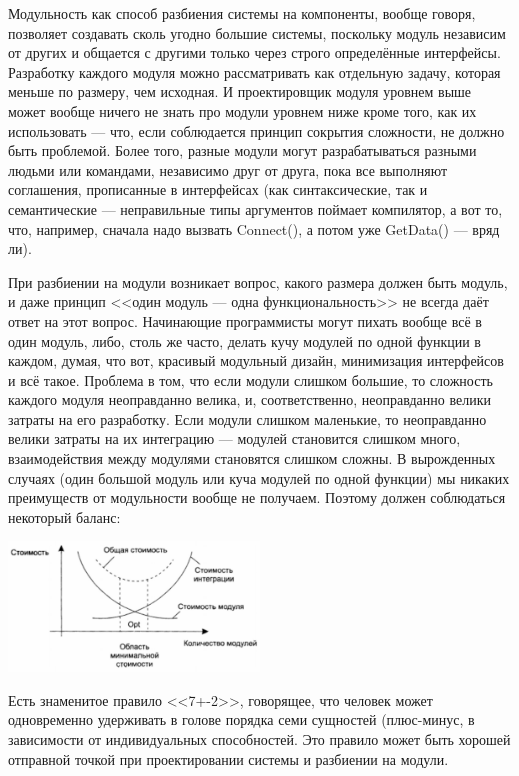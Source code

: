 \documentclass[a5paper]{article}
\begin{document}
Модульность как способ разбиения системы на компоненты, вообще говоря, позволяет создавать сколь угодно большие системы, поскольку модуль независим от других и общается с другими только через строго определённые интерфейсы. Разработку каждого модуля можно рассматривать как отдельную задачу, которая меньше по размеру, чем исходная. И проектировщик модуля уровнем выше может вообще ничего не знать про модули уровнем ниже кроме того, как их использовать --- что, если соблюдается принцип сокрытия сложности, не должно быть проблемой. Более того, разные модули могут разрабатываться разными людьми или командами, независимо друг от друга, пока все выполняют соглашения, прописанные в интерфейсах (как синтаксические, так и семантические --- неправильные типы аргументов поймает компилятор, а вот то, что, например, сначала надо вызвать Connect(), а потом уже GetData() --- вряд ли).

При разбиении на модули возникает вопрос, какого размера должен быть модуль, и даже принцип <<один модуль --- одна функциональность>> не всегда даёт ответ на этот вопрос. Начинающие программисты могут пихать вообще всё в один модуль, либо, столь же часто, делать кучу модулей по одной функции в каждом, думая, что вот, красивый модульный дизайн, минимизация интерфейсов и всё такое. Проблема в том, что если модули слишком большие, то сложность каждого модуля неоправданно велика, и, соответственно, неоправданно велики затраты на его разработку. Если модули слишком маленькие, то неоправданно велики затраты на их интеграцию --- модулей становится слишком много, взаимодействия между модулями становятся слишком сложны. В вырожденных случаях (один большой модуль или куча модулей по одной функции) мы никаких преимуществ от модульности вообще не получаем. Поэтому должен соблюдаться некоторый баланс:

\begin{center}
    \includegraphics[width=0.5\textwidth]{modulesCost.png}
\end{center}

Есть знаменитое правило <<7+-2>>, говорящее, что человек может одновременно удерживать в голове порядка семи сущностей (плюс-минус, в зависимости от индивидуальных способностей. Это правило может быть хорошей отправной точкой при проектировании системы и разбиении на модули.
\end{document}
